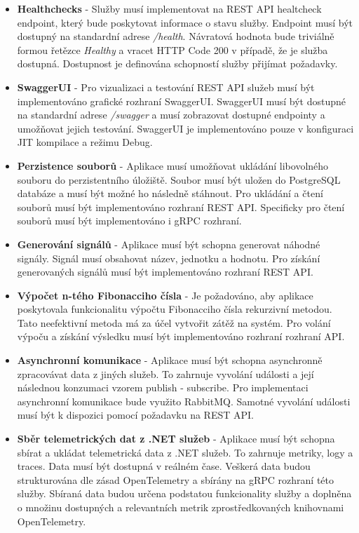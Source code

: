 \begin{itemize}
  \item \textbf{Healthchecks} - Služby musí implementovat na REST API healtcheck endpoint, který bude poskytovat informace o stavu služby. Endpoint musí být dostupný na standardní adrese \emph{/health}. Návratová hodnota bude triviálně formou řetězce \emph{Healthy} a vracet HTTP Code 200 v případě, že je služba dostupná. Dostupnost je definována schopností služby přijímat požadavky.
  \item \textbf{SwaggerUI} - Pro vizualizaci a testování REST API služeb musí být implementováno grafické rozhraní SwaggerUI. SwaggerUI musí být dostupné na standardní adrese \emph{/swagger} a musí zobrazovat dostupné endpointy a umožňovat jejich testování. SwaggerUI je implementováno pouze v konfiguraci JIT kompilace a režimu Debug.
  \item \textbf{Perzistence souborů} - Aplikace musí umožňovat ukládání libovolného souboru do perzistentního úložiště. Soubor musí být uložen do PostgreSQL databáze a musí být možné ho následně stáhnout. Pro ukládání a čtení souborů musí být implementováno rozhraní REST API. Specificky pro čtení souborů musí být implementováno i gRPC rozhraní.
  \item \textbf{Generování signálů} - Aplikace musí být schopna generovat náhodné signály. Signál musí obsahovat název, jednotku a hodnotu. Pro získání generovaných signálů musí být implementováno rozhraní REST API.
  \item \textbf{Výpočet n-tého Fibonacciho čísla} - Je požadováno, aby aplikace poskytovala funkcionalitu výpočtu Fibonacciho čísla rekurzivní metodou. Tato neefektivní metoda má za účel vytvořit zátěž na systém. Pro volání výpoču a získání výsledku musí být implementováno rozhraní rozhraní API.
  \item \textbf{Asynchronní komunikace} - Aplikace musí být schopna asynchronně zpracovávat data z jiných služeb. To zahrnuje vyvolání události a její následnou konzumaci vzorem publish - subscribe. Pro implementaci asynchronní komunikace bude využito RabbitMQ. Samotné vyvolání události musí být k dispozici pomocí požadavku na REST API.
  \item \textbf{Sběr telemetrických dat z .NET služeb} - Aplikace musí být schopna sbírat a ukládat telemetrická data z .NET služeb. To zahrnuje metriky, logy a traces. Data musí být dostupná v reálném čase. Veškerá data budou strukturována dle zásad OpenTelemetry a sbírány na gRPC rozhraní této služby. Sbíraná data budou určena podstatou funkcionality služby a doplněna o množinu dostupných a relevantních metrik zprostředkovaných knihovnami OpenTelemetry.

\end{itemize}
